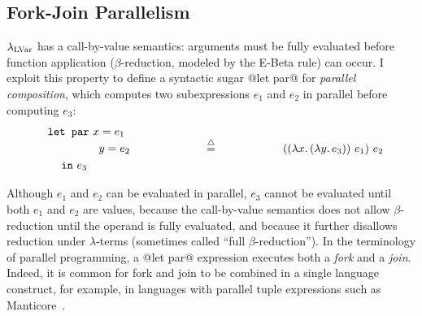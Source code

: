 \subsection{Fork-Join Parallelism}\label{subsection:fork-join}

$\lambda_{\textrm{LVar}}$ has a call-by-value semantics: arguments must be fully
evaluated before function application ($\beta$-reduction, modeled by
the {\sc E-Beta} rule) can occur.  I exploit this property to define a
syntactic sugar @let par@ for \emph{parallel composition}, which
computes two subexpressions $e_1$ and $e_2$ in parallel before
computing $e_3$:
\begin{displaymath}
\begin{minipage}[b]{2in}
  \begin{equation*}
\begin{split}
& \LETPAR ~x = e_1 \\ 
& \letparspace ~y = e_2 \\
& \letspace \IN~e_3 
\end{split}
\end{equation*}
\end{minipage}
\begin{minipage}[b]{1in}
\centering
$\defeq$
\end{minipage}
\begin{minipage}[b]{2in}
\begin{equation*}
  \app{(\app{(\lam{x}{(\lam{y}{e_3})})}{e_1})}{e_2}
\end{equation*}
\end{minipage}
\end{displaymath}

Although $e_1$ and $e_2$ can be evaluated in parallel, $e_3$ cannot be
evaluated until both $e_1$ and $e_2$ are values, because the
call-by-value semantics does not allow $\beta$-reduction until the
operand is fully evaluated, and because it further disallows reduction
under $\lambda$-terms (sometimes called ``full $\beta$-reduction'').
In the terminology of parallel programming, a @let par@ expression
executes both a \emph{fork} and a \emph{join}.  Indeed, it is common
for fork and join to be combined in a single language construct, for
example, in languages with parallel tuple expressions such as
Manticore~\cite{manticore_parallel_tuples}.

